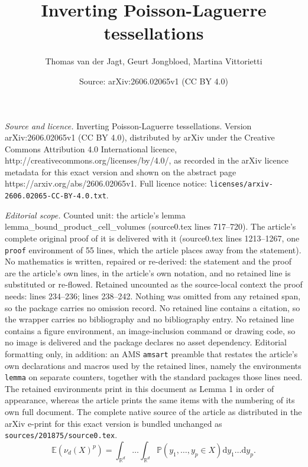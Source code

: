 \documentclass[10pt,a4paper]{amsart}
\title{Inverting Poisson-Laguerre tessellations}
\author{Thomas van der Jagt, Geurt Jongbloed, Martina Vittorietti}
\date{Source: arXiv:2606.02065v1 (CC BY 4.0)}
\newcommand{\EE}{\mathbb{E}}
\newcommand{\PP}{\mathbb{P}}
\newcommand{\RR}{\mathbb{R}}
\begin{document}
\maketitle

\noindent\emph{Source and licence.} Inverting Poisson-Laguerre tessellations. Version arXiv:2606.02065v1 (CC BY 4.0), distributed by arXiv under the Creative Commons Attribution 4.0 International licence, http://creativecommons.org/licenses/by/4.0/, as recorded in the arXiv licence metadata for this exact version and shown on the abstract page https://arxiv.org/abs/2606.02065v1. Full licence notice: \texttt{licenses/arxiv-2606.02065-CC-BY-4.0.txt}.\par\smallskip

\noindent\textit{Editorial scope.} Counted unit: the article's lemma lemma\_bound\_product\_cell\_volumes (source0.tex lines 717--720). The article's complete original proof of it is delivered with it (source0.tex lines 1213--1267, one \texttt{proof} environment of 55 lines, which the article places away from the statement). No mathematics is written, repaired or re-derived: the statement and the proof are the article's own lines, in the article's own notation, and no retained line is substituted or re-flowed.  Retained uncounted as the source-local context the proof needs: lines 234--236; lines 238--242.  Nothing was omitted from any retained span, so the package carries no omission record.  No retained line contains a citation, so the wrapper carries no bibliography and no bibliography entry.  No retained line contains a figure environment, an image-inclusion command or drawing code, so no image is delivered and the package declares no asset dependency.  Editorial formatting only, in addition: an AMS \texttt{amsart} preamble that restates the article's own declarations and macros used by the retained lines, namely the environments \texttt{lemma} on separate counters, together with the standard packages those lines need.  The retained environments print in this document as Lemma 1 in order of appearance, whereas the article prints the same items with the numbering of its own full document.  The complete native source of the article as distributed in the arXiv e-print for this exact version is bundled unchanged as \texttt{sources/201875/source0.tex}.
\begin{equation}
    \EE\left(\nu_d(X)^p\right) = \int_{\RR^d}\dots\int_{\RR^d}\PP(y_1,\dots,y_p \in X)\mathrm{d}y_1 \dots \mathrm{d}y_p. \label{Robbins_thm}
\end{equation}
\end{document}
